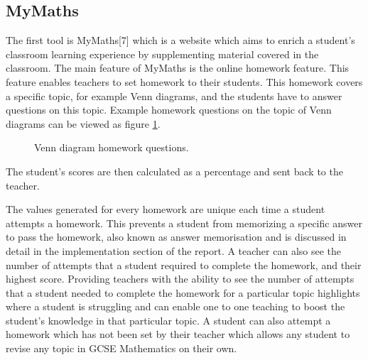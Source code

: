 \documentclass{article}
\begin{document}
\subsection{MyMaths}

The first tool is MyMaths[7] which is a website which aims to enrich a student's classroom learning experience by supplementing material covered in the classroom. The main feature of MyMaths is the online homework feature. This feature enables teachers to set homework to their students. This homework covers a specific topic, for example Venn diagrams, and the students have to answer questions on this topic. Example homework questions on the topic of Venn diagrams can be viewed as figure \ref{figure:mymathsHomeworkQuestion1}.
\begin{figure}[H]
	\centering
	\caption{Venn diagram homework questions.}
	\label{figure:mymathsHomeworkQuestion1}
\end{figure}
The student's scores are then calculated as a percentage and sent back to the teacher. \par

The values generated for every homework are unique each time a student attempts a homework. This prevents a student from memorizing a specific answer to pass the homework, also known as answer memorisation and is discussed in detail in the implementation section of the report. A teacher can also see the number of attempts that a student required to complete the homework, and their highest score. Providing teachers with the ability to see the number of attempts that a student needed to complete the homework for a particular topic highlights where a student is struggling and can enable one to one teaching to boost the student's knowledge in that particular topic. A student can also attempt a homework which has not been set by their teacher which allows any student to revise any topic in GCSE Mathematics on their own. \par
\end{document}
